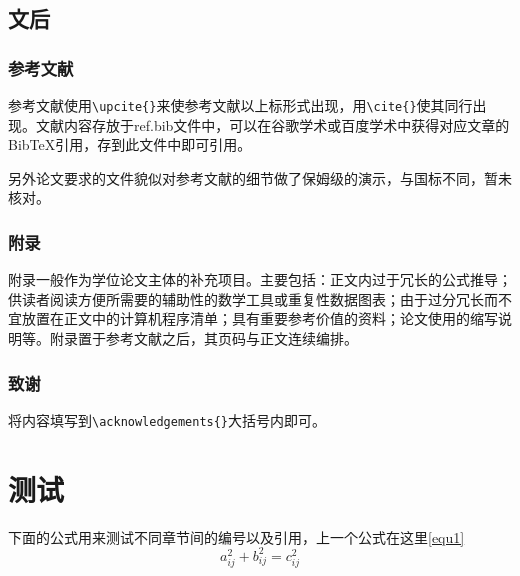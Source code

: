 \documentclass{bucthesis}
\begin{document}
\section{文后}
\subsection{参考文献}{\par
	参考文献使用\verb|\upcite{}|来使参考文献以上标形式出现，用\verb|\cite{}|使其同行出现。文献内容存放于ref.bib文件中，可以在谷歌学术或百度学术中获得对应文章的BibTeX引用，存到此文件中即可引用。\par
	另外论文要求的文件貌似对参考文献的细节做了保姆级的演示，与国标不同，暂未核对。}
\subsection{附录}{\par
	附录一般作为学位论文主体的补充项目。主要包括：正文内过于冗长的公式推导；供读者阅读方便所需要的辅助性的数学工具或重复性数据图表；由于过分冗长而不宜放置在正文中的计算机程序清单；具有重要参考价值的资料；论文使用的缩写说明等。附录置于参考文献之后，其页码与正文连续编排。}
\subsection{致谢}{\par
	将内容填写到\verb|\acknowledgements{}|大括号内即可。\par}

\chapter{测试}{\par
	下面的公式用来测试不同章节间的编号以及引用，上一个公式在这里\ref{equ1}
	\begin{equation}
	a^2_{ij}+b^2_{ij}=c^2_{ij}
	\end{equation}}
\end{document}
